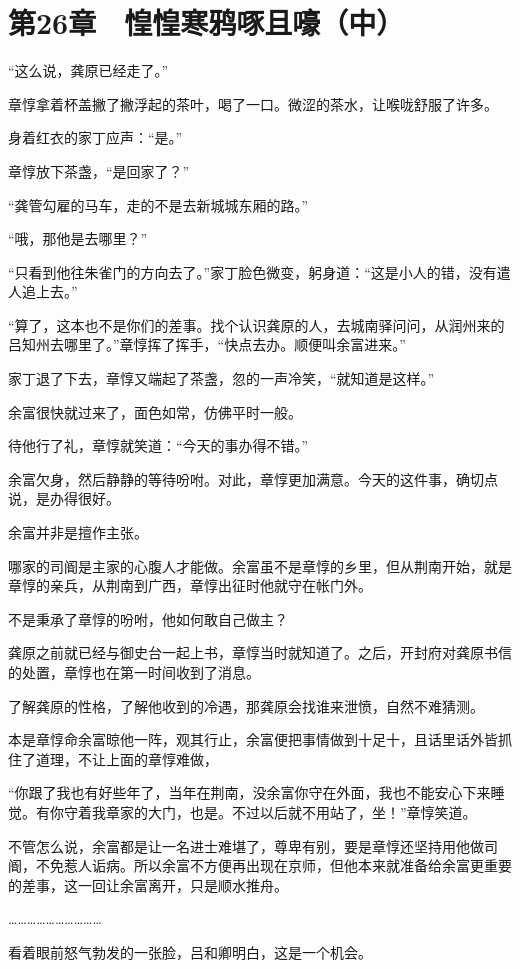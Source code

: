 \section{第26章　惶惶寒鸦啄且嚎（中）}

“这么说，龚原已经走了。”

章惇拿着杯盖撇了撇浮起的茶叶，喝了一口。微涩的茶水，让喉咙舒服了许多。

身着红衣的家丁应声：“是。”

章惇放下茶盏，“是回家了？”

“龚管勾雇的马车，走的不是去新城城东厢的路。”

“哦，那他是去哪里？”

“只看到他往朱雀门的方向去了。”家丁脸色微变，躬身道：“这是小人的错，没有遣人追上去。”

“算了，这本也不是你们的差事。找个认识龚原的人，去城南驿问问，从润州来的吕知州去哪里了。”章惇挥了挥手，“快点去办。顺便叫余富进来。”

家丁退了下去，章惇又端起了茶盏，忽的一声冷笑，“就知道是这样。”

余富很快就过来了，面色如常，仿佛平时一般。

待他行了礼，章惇就笑道：“今天的事办得不错。”

余富欠身，然后静静的等待吩咐。对此，章惇更加满意。今天的这件事，确切点说，是办得很好。

余富并非是擅作主张。

哪家的司阍是主家的心腹人才能做。余富虽不是章惇的乡里，但从荆南开始，就是章惇的亲兵，从荆南到广西，章惇出征时他就守在帐门外。

不是秉承了章惇的吩咐，他如何敢自己做主？

龚原之前就已经与御史台一起上书，章惇当时就知道了。之后，开封府对龚原书信的处置，章惇也在第一时间收到了消息。

了解龚原的性格，了解他收到的冷遇，那龚原会找谁来泄愤，自然不难猜测。

本是章惇命余富晾他一阵，观其行止，余富便把事情做到十足十，且话里话外皆抓住了道理，不让上面的章惇难做，

“你跟了我也有好些年了，当年在荆南，没余富你守在外面，我也不能安心下来睡觉。有你守着我章家的大门，也是。不过以后就不用站了，坐！”章惇笑道。

不管怎么说，余富都是让一名进士难堪了，尊卑有别，要是章惇还坚持用他做司阍，不免惹人诟病。所以余富不方便再出现在京师，但他本来就准备给余富更重要的差事，这一回让余富离开，只是顺水推舟。

…………………………

看着眼前怒气勃发的一张脸，吕和卿明白，这是一个机会。

